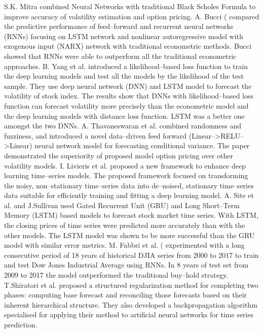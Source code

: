 \documentclass[12pt,a4paper]{report}
\numberwithin{equation}{section}
\begin{document}
S.K. Mitra \cite{kmitra2012option_26} combined Neural Networks with traditional Black
Scholes Formula to improve accuracy of volatility estimation and option
pricing. A. Bucci ( \cite{bucci2020realized_27} compared the predictive performance of
feed--forward and recurrent neural networks (RNNs) focusing on LSTM
network and nonlinear autoregressive model with exogenous input (NARX)
network with traditional econometric methods. Bucci showed that RNNs
were able to outperform all the traditional econometric approaches. B.
Yang et al. \cite{jia2021forecasting_28} introduced a likelihood--based loss function to
train the deep learning models and test all the models by the likelihood
of the test sample. They use deep neural network (DNN) and LSTM model to
forecast the volatility of stock index. The results show that DNNs with
likelihood--based loss function can forecast volatility more precisely
than the econometric model and the deep learning models with distance
loss function. LSTM was a better one amongst the two DNNs. A.
Thavaneswaran et al. \cite{thavaneswaran2019fuzzy_29} combined randomness and fuzziness, and
introduced a novel data--driven feed forward
(Linear--\textgreater RELU--\textgreater Linear) neural network model for
forecasting conditional variance. The paper demonstrated the superiority
of proposed model option pricing over other volatility models. I.
Livieris et al. \cite{livieris2021smoothing_25} proposed a new framework to enhance deep
learning time--series models. The proposed framework focused on
transforming the noisy, non--stationary time--series data into de--noised,
stationary time--series data suitable for efficiently training and
fitting a deep learning model. A. Site et al. \cite{site2019stock_30} and J.Sullivan
\cite{sullivan2019stock_31} used Gated Recurrent Unit (GRU) and Long Short--Term Memory
(LSTM) based models to forecast stock market time series. With LSTM, the
closing prices of time series were predicted more accurately than with
the other models. The LSTM model was shown to be more successful than
the GRU model with similar error metrics. M. Fabbri et al. ( \cite{fabbri2018dow_32}
experimented with a long consecutive period of 18 years of historical
DJIA series from 2000 to 2017 to train and test Dow Jones Industrial
Average using RNNs. In 8 years of test set from 2009 to 2017 the model
outperformed the traditional buy--hold strategy. T.Shiratori et al.
\cite{t2020prediction_33} proposed a structured regularization method for completing two
phases: computing base forecast and reconciling those forecasts based on
their inherent hierarchical structure. They also developed a
backpropagation algorithm specialised for applying their method to
artificial neural networks for time series prediction.
\end{document}
